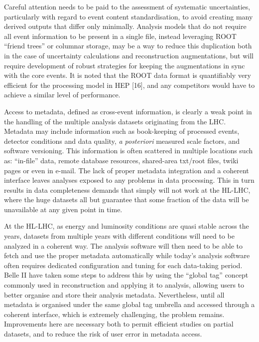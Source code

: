\documentclass[11pt,a4paper]{article}
\begin{document}
Careful attention needs to be paid to the assessment of systematic
uncertainties, particularly with regard to event content
standardisation, to avoid creating many derived outputs that differ only
minimally. Analysis models that do not require all event information to
be present in a single file, instead leveraging ROOT ``friend trees'' or
columnar storage, may be a way to reduce this duplication both in the
case of uncertainty calculations and reconstruction augmentations, but
will require development of robust strategies for keeping the
augmentations in sync with the core events. It is noted that the ROOT
data format is quantifiably very efficient for the processing model in
HEP {[}16{]}, and any competitors would have to achieve a similar level
of performance.

Access to metadata, defined as cross-event information, is clearly a
weak point in the handling of the multiple analysis datasets originating
from the LHC. Metadata may include information such as book-keeping of
processed events, detector conditions and data quality, \emph{a
posteriori} measured scale factors, and software versioning. This
information is often scattered in multiple locations such as:
``in-file'' data, remote database resources, shared-area txt/root files,
twiki pages or even in e-mail. The lack of proper metadata integration
and a coherent interface leaves analyses exposed to any problems in data
processing. This in turn results in data completeness demands that
simply will not work at the HL-LHC, where the huge datasets all but
guarantee that some fraction of the data will be unavailable at any
given point in time.

At the HL-LHC, as energy and luminosity conditions are quasi stable
across the years, datasets from multiple years with different conditions
will need to be analyzed in a coherent way. The analysis software will
then need to be able to fetch and use the proper metadata automatically
while today's analysis software often requires dedicated configuration
and tuning for each data-taking period. Belle II have taken some steps
to address this by using the ``global tag'' concept commonly used in
reconstruction and applying it to analysis, allowing users to better
organise and store their analysis metadata. Nevertheless, until all
metadata is organised under the same global tag umbrella and accessed
through a coherent interface, which is extremely challenging, the
problem remains. Improvements here are necessary both to permit
efficient studies on partial datasets, and to reduce the risk of user
error in metadata access.
\end{document}
